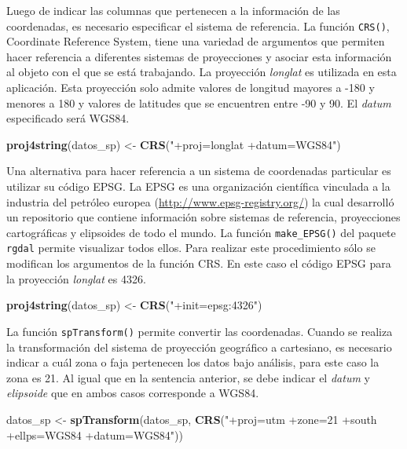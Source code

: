 \documentclass[11pt,b5paper,]{krantz}
\newenvironment{Shaded}{}{}
\newcommand{\KeywordTok}[1]{\textcolor[rgb]{0.00,0.44,0.13}{\textbf{#1}}}
\newcommand{\StringTok}[1]{\textcolor[rgb]{0.25,0.44,0.63}{#1}}
\newcommand{\NormalTok}[1]{#1}
\begin{document}
Luego de indicar las columnas que pertenecen a la información de las
coordenadas, es necesario especificar el sistema de referencia. La
función \texttt{CRS()}, Coordinate Reference System, tiene una variedad
de argumentos que permiten hacer referencia a diferentes sistemas de
proyecciones y asociar esta información al objeto con el que se está
trabajando. La proyección \emph{longlat} es utilizada en esta
aplicación. Esta proyección solo admite valores de longitud mayores a
-180 y menores a 180 y valores de latitudes que se encuentren entre -90
y 90. El \emph{datum} especificado será WGS84.

\begin{Shaded}
\begin{Highlighting}[]
\KeywordTok{proj4string}\NormalTok{(datos_sp) <-}\StringTok{ }
\StringTok{  }\KeywordTok{CRS}\NormalTok{(}\StringTok{"+proj=longlat +datum=WGS84"}\NormalTok{)}
\end{Highlighting}
\end{Shaded}

Una alternativa para hacer referencia a un sistema de coordenadas
particular es utilizar su código EPSG. La EPSG es una organización
científica vinculada a la industria del petróleo europea
(\url{http://www.epsg-registry.org/}) la cual desarrolló un repositorio
que contiene información sobre sistemas de referencia, proyecciones
cartográficas y elipsoides de todo el mundo. La función
\texttt{make\_EPSG()} del paquete \texttt{rgdal} permite visualizar
todos ellos. Para realizar este procedimiento sólo se modifican los
argumentos de la función CRS. En este caso el código EPSG para la
proyección \emph{longlat} es 4326.

\begin{Shaded}
\begin{Highlighting}[]
\KeywordTok{proj4string}\NormalTok{(datos_sp) <-}\StringTok{ }\KeywordTok{CRS}\NormalTok{(}\StringTok{"+init=epsg:4326"}\NormalTok{)}
\end{Highlighting}
\end{Shaded}

La función \texttt{spTransform()} permite convertir las coordenadas.
Cuando se realiza la transformación del sistema de proyección geográfico
a cartesiano, es necesario indicar a cuál zona o faja pertenecen los
datos bajo análisis, para este caso la zona es 21. Al igual que en la
sentencia anterior, se debe indicar el \emph{datum} y \emph{elipsoide}
que en ambos casos corresponde a WGS84.

\begin{Shaded}
\begin{Highlighting}[]
\NormalTok{datos_sp <-}
\StringTok{  }\KeywordTok{spTransform}\NormalTok{(datos_sp,}
              \KeywordTok{CRS}\NormalTok{(}\StringTok{"+proj=utm +zone=21 +south}
\StringTok{     +ellps=WGS84 +datum=WGS84"}\NormalTok{))}
\end{Highlighting}
\end{Shaded}
\end{document}

